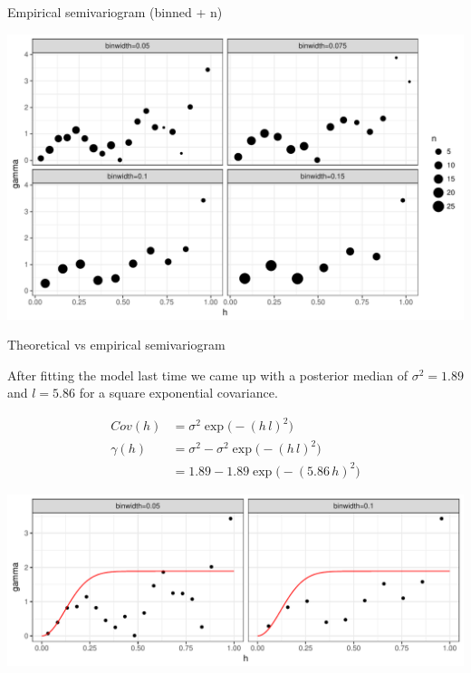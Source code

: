 \documentclass[11pt,ignorenonframetext,]{beamer}
\begin{document}
\begin{frame}{Empirical semivariogram (binned + n)}

\includegraphics{Lec13_files/figure-beamer/unnamed-chunk-8-1.pdf}

\end{frame}

\begin{frame}{Theoretical vs empirical semivariogram}

After fitting the model last time we came up with a posterior median of
\(\sigma^2 = 1.89\) and \(l=5.86\) for a square exponential covariance.

\pause

\scriptsize
\[ \begin{aligned}
Cov(h) &= \sigma^2 \exp\big(-(h\,l)^2\big) \\
\gamma(h) 
  &= \sigma^2 - \sigma^2 \exp\big(-(h\,l)^2\big) \\
  &= 1.89 - 1.89 \exp\big(-(5.86\, h)^2\big)
\end{aligned}\]

\pause

\includegraphics{Lec13_files/figure-beamer/unnamed-chunk-9-1.pdf}

\end{frame}
\end{document}
